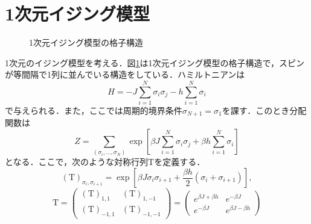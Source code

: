 \documentclass[a4paper,11pt]{jsreport}
\begin{document}
\section{1次元イジング模型}
\begin{figure}[H]
  \begin{center}
    \caption{1次元イジング模型の格子構造}
    \label{1次元イジング模型格子構造}
  \end{center}
\end{figure}
1次元のイジング模型を考える．図\ref{1次元イジング模型格子構造}は1次元イジング模型の格子構造で，スピンが等間隔で1列に並んでいる構造をしている．ハミルトニアンは
\begin{equation}
  H = -J \sum_{i=1}^N \sigma_i \sigma_j - h \sum_{i=1}^N \sigma_i \label{1次元イジングエネルギー}
\end{equation}
で与えられる．また，ここでは周期的境界条件$\sigma_{N+1} = \sigma_{1}$を課す．このとき分配関数は
\begin{equation}
  Z = \sum_{(\sigma_i,\dots,\sigma_N)} \exp{\left[ \beta J \sum_{i=1}^N \sigma_i \sigma_j + \beta h \sum_{i=1}^N \sigma_i \right]} \label{1次元イジング分配関数}
\end{equation}
となる．ここで，次のような対称行列$\mathrm{T}$を定義する．
\begin{equation}
  (\mathrm{T})_{\sigma_i, \sigma_{i+1}} = \exp{\left[ \beta J \sigma_i \sigma_{i+1} + \frac{\beta h}{2}(\sigma_i + \sigma_{i+1}) \right]},
\end{equation}
\begin{equation}
  \mathrm{T} = \begin{pmatrix}
    (\mathrm{T})_{1,1}  & (\mathrm{T})_{1,-1}  \\
    (\mathrm{T})_{-1,1} & (\mathrm{T})_{-1,-1}
  \end{pmatrix}=
  \begin{pmatrix}
    e^{\beta J + \beta h} & e^{-\beta J}          \\
    e^{-\beta J}          & e^{\beta J - \beta h}
  \end{pmatrix}
\end{equation}
\end{document}
